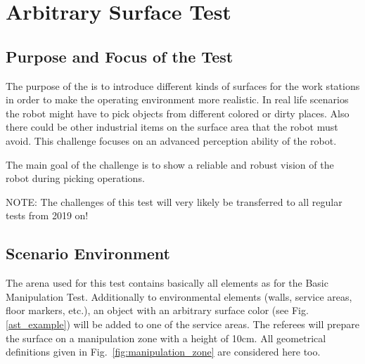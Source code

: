 
\newpage
\section{Arbitrary Surface Test}

\subsection{Purpose and Focus of the Test}
The purpose of the  is to introduce different kinds of surfaces for the work stations in order to make the operating environment more realistic. In real life scenarios the robot might have to pick objects from different colored or dirty places. Also there could be other industrial items on the surface area that the robot must avoid. This challenge focuses on an advanced perception ability of the robot. \par The main goal of the challenge is to show a reliable and robust vision of the robot during picking operations.

\par
NOTE: The challenges of this test will very likely be transferred to all regular tests from 2019 on!

\subsection{Scenario Environment}
The arena used for this test contains basically all elements as for the Basic Manipulation Test. Additionally to environmental elements (walls, service areas, floor markers, etc.), an object with an arbitrary surface color (see Fig. \ref{ast_example}) will be added to one of the service areas. The referees will prepare the surface on a manipulation zone with a height of 10cm. All geometrical definitions given in Fig.~\ref{fig:manipulation_zone} are considered here too.

